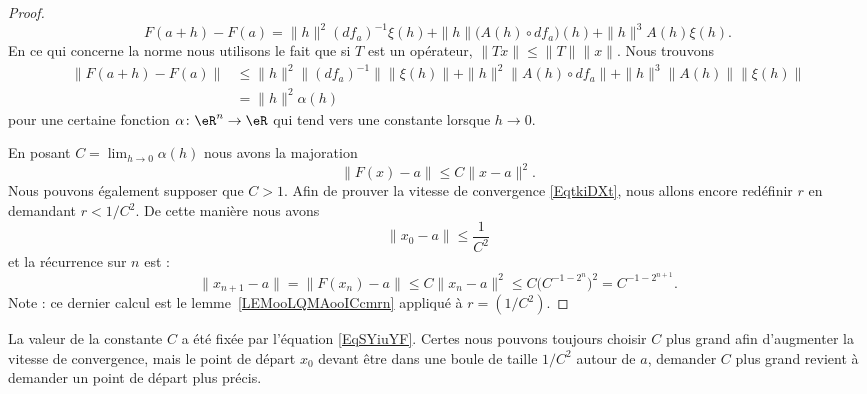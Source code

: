 \begin{proof}
	\begin{equation}
		F(a+h)-F(a)=\| h \|^2(df_a)^{-1}\xi(h)+\| h \|\big( A(h)\circ df_a \big)(h)+\| h \|^3A(h)\xi(h).
	\end{equation}
	En ce qui concerne la norme nous utilisons le fait que si \( T\) est un opérateur, \( \| Tx \|\leq \| T \|\| x \|\). Nous trouvons
	\begin{subequations}
		\begin{align}
			\| F(a+h)-F(a) \| & \leq \| h \|^2\| (df_a)^{-1} \|\| \xi(h) \|+\| h \|^2\| A(h)\circ df_a \|+\| h \|^3\| A(h) \|\| \xi(h) \| \\
			                  & =\| h \|^2\alpha(h)
		\end{align}
	\end{subequations}
	pour une certaine fonction \( \alpha\colon \eR^n\to \eR\) qui tend vers une constante lorsque \( h\to 0\).

	En posant \( C=\lim_{h\to 0}\alpha(h) \) nous avons la majoration
	\begin{equation}        \label{EqSYiuYF}
		\| F(x)-a \|\leq C\| x-a \|^2.
	\end{equation}
	Nous pouvons également supposer que \( C>1\). Afin de prouver la vitesse de convergence \eqref{EqtkiDXt}, nous allons encore redéfinir \( r\) en demandant \( r<1/C^2\). De cette manière nous avons
	\begin{equation}
		\| x_0-a \|\leq \frac{1}{ C^2 }
	\end{equation}
	et la récurrence sur \( n\) est :
	\begin{equation}
		\| x_{n+1}-a \|=\| F(x_n)-a \|\leq C\| x_n-a \|^2\leq C\big( C^{-1-2^n} \big)^2=C^{-1-2^{n+1}}.
	\end{equation}
	Note : ce dernier calcul est le lemme~\ref{LEMooLQMAooICcmrn} appliqué à \( r=(1/C^2)\).
\end{proof}

\begin{remark}
	La valeur de la constante \( C\) a été fixée par l'équation \eqref{EqSYiuYF}. Certes nous pouvons toujours choisir \( C\) plus grand afin d'augmenter la vitesse de convergence, mais le point de départ \( x_0\) devant être dans une boule de taille \( 1/C^2\) autour de \( a\), demander \( C \) plus grand revient à demander un point de départ plus précis.
\end{remark}
